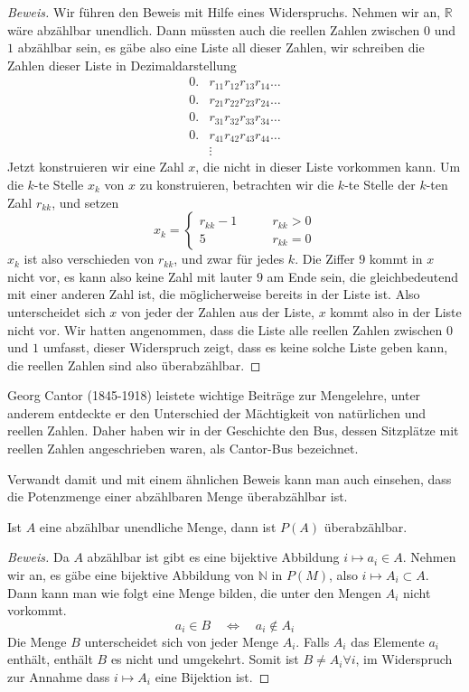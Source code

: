 \begin{proof}[Beweis]
Wir führen den Beweis mit Hilfe eines Widerspruchs. Nehmen wir
an, $\mathbb R$ wäre abzählbar unendlich. Dann müssten auch
die reellen Zahlen zwischen $0$ und $1$ abzählbar sein,  es gäbe also eine
Liste all dieser Zahlen, wir schreiben die Zahlen
dieser Liste in Dezimaldarstellung
\begin{align*}
0.&r_{11}r_{12}r_{13}r_{14}\dots\\
0.&r_{21}r_{22}r_{23}r_{24}\dots\\
0.&r_{31}r_{32}r_{33}r_{34}\dots\\
0.&r_{41}r_{42}r_{43}r_{44}\dots\\
&\vdots
\end{align*}
Jetzt konstruieren wir eine Zahl $x$, die nicht in dieser Liste vorkommen
kann. Um die $k$-te Stelle $x_k$ von $x$ zu konstruieren, betrachten
wir die $k$-te Stelle der $k$-ten Zahl $r_{kk}$, und setzen
\[
x_k=\begin{cases}
r_{kk}-1&\qquad r_{kk}>0\\
5&\qquad r_{kk}=0
\end{cases}
\]
$x_k$ ist also verschieden von $r_{kk}$, und zwar für jedes $k$.
Die Ziffer $9$ kommt in $x$ nicht vor, es kann also keine Zahl
mit lauter $9$ am Ende sein, die gleichbedeutend mit einer anderen
Zahl ist, die möglicherweise bereits in der Liste ist.
Also unterscheidet sich $x$ von jeder der Zahlen aus der Liste, $x$
kommt also in der Liste nicht vor. Wir hatten angenommen, dass die
Liste alle reellen Zahlen zwischen $0$ und $1$ umfasst, dieser
Widerspruch zeigt, dass es keine solche Liste geben kann, die
reellen Zahlen sind also überabzählbar.
\end{proof}

Georg Cantor (1845-1918) leistete wichtige Beiträge zur Mengelehre,
unter anderem entdeckte er den Unterschied der Mächtigkeit von
natürlichen und reellen Zahlen. Daher haben wir in der Geschichte
den Bus, dessen Sitzplätze mit reellen Zahlen angeschrieben waren,
als Cantor-Bus bezeichnet.

Verwandt damit und mit einem ähnlichen Beweis kann man auch einsehen,
dass die Potenzmenge einer abzählbaren Menge überabzählbar ist.

\begin{satz}\label{powersetuncountable}
Ist $A$ eine abzählbar unendliche Menge, dann ist $P(A)$
überabzählbar.
\end{satz}

\begin{proof}[Beweis]
Da $A$ abzählbar ist gibt es eine bijektive Abbildung
$i\mapsto a_i\in A$. Nehmen wir an, es gäbe eine bijektive
Abbildung von $\mathbb N$ in $P(M)$, also $i\mapsto A_i\subset A$.
Dann kann man wie folgt eine Menge bilden, die unter den Mengen
$A_i$ nicht vorkommt.
\[
a_i\in B\quad\Leftrightarrow\quad a_i\not\in A_i
\]
Die Menge $B$ unterscheidet sich von jeder Menge $A_i$. Falls
$A_i$ das Elemente $a_i$ enthält, enthält $B$ es nicht und
umgekehrt. Somit ist $B\ne A_i\forall i$, im Widerspruch zur Annahme
dass $i\mapsto A_i$ eine Bijektion ist.
\end{proof}

